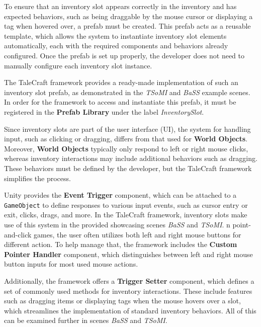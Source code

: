 To ensure that an inventory slot appears correctly in the inventory and has expected behaviors, such as being draggable by the mouse cursor or displaying a tag when hovered over, a prefab must be created. This prefab acts as a reusable template, which allows the system to instantiate inventory slot elements automatically, each with the required components and behaviors already configured. Once the prefab is set up properly, the developer does not need to manually configure each inventory slot instance.

The TaleCraft framework provides a ready-made implementation of such an inventory slot prefab, as demonstrated in the \textit{TSoMI} and \textit{BaSS} example scenes. In order for the framework to access and instantiate this prefab, it must be registered in the \textbf{Prefab Library} under the label \textit{InventorySlot}.

Since inventory slots are part of the user interface (UI), the system for handling input, such as clicking or dragging, differs from that used for \textbf{World Objects}. Moreover, \textbf{World Objects} typically only respond to left or right mouse clicks, whereas inventory interactions may include additional behaviors such as dragging. These behaviors must be defined by the developer, but the TaleCraft framework simplifies the process.

Unity provides the \textbf{Event Trigger} component, which can be attached to a \verb|GameObject| to define responses to various input events, such as cursor entry or exit, clicks, drags, and more. In the TaleCraft framework, inventory slots make use of this system in the provided showcasing scenes \textit{BaSS} and \textit{TSoMI}. n point-and-click games, the user often utilizes both left and right mouse buttons for different action. To help manage that, the framework includes the \textbf{Custom Pointer Handler} component, which distinguishes between left and right mouse button inputs for most used mouse actions.

Additionally, the framework offers a \textbf{Trigger Setter} component, which defines a set of commonly used methods for inventory interactions. These include features such as dragging items or displaying tags when the mouse hovers over a slot, which streamlines the implementation of standard inventory behaviors. All of this can be examined further in scenes \textit{BaSS} and \textit{TSoMI}.

